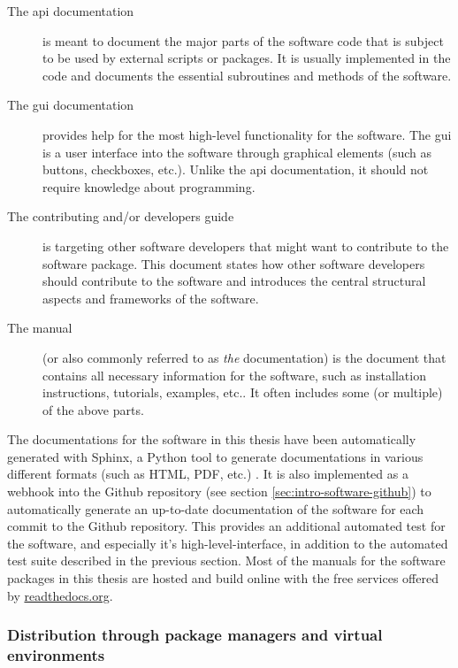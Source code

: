 \begin{refsection}
\begin{description}
	\item[The \gls{api} documentation] is meant to document the major parts of the software code that is subject to be used by external scripts or packages. It is usually implemented in the code and documents the essential subroutines and methods of the software.
	\item[The \gls{gui} documentation] provides help for the most high-level functionality for the software. The \gls{gui} is a user interface into the software through graphical elements (such as buttons, checkboxes, etc.). Unlike the \gls{api} documentation, it should not require knowledge about programming.
	\item[The contributing and/or developers guide] is targeting other software developers that might want to contribute to the software package. This document states how other software developers should contribute to the software and introduces the central structural aspects and frameworks of the software.
	\item[The manual] (or also commonly referred to as \textit{the} documentation) is the document that contains all necessary information for the software, such as installation instructions, tutorials, examples, etc.. It often includes some (or multiple) of the above parts.
\end{description}

The documentations for the software in this thesis have been automatically generated with Sphinx, a Python tool to generate documentations in various different formats (such as HTML, PDF, etc.)  \citep{PerezGrangerHunter2011, Hasecke2019}. It is also implemented as a webhook into the Github repository (see section \ref{sec:intro-software-github}) to automatically generate an up-to-date documentation of the software for each commit to the Github repository. This provides an additional automated test for the software, and especially it's high-level-interface, in addition to the automated test suite described in the previous section. Most of the manuals for the software packages in this thesis are hosted and build online with the free services offered by \href{https://readthedocs.org/}{readthedocs.org}.


\subsubsection{Distribution through package managers and virtual environments} \label{sec:intro-software-conda}


\end{refsection}
